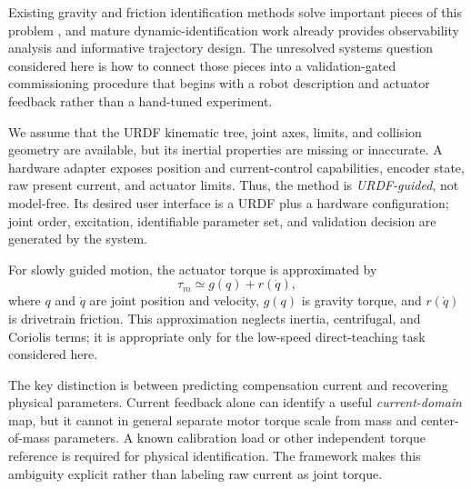 \documentclass[conference]{IEEEtran}
\begin{document}
Existing gravity and friction identification methods solve important pieces of
this problem \cite{Chen2018,Chen2023}, and mature dynamic-identification work
already provides observability analysis and informative trajectory design.
The unresolved systems question considered here is how to connect those pieces
into a validation-gated commissioning procedure that begins with a robot
description and actuator feedback rather than a hand-tuned experiment.

We assume that the URDF kinematic tree, joint axes, limits, and collision
geometry are available, but its inertial properties are missing or inaccurate.
A hardware adapter exposes position and current-control capabilities, encoder
state, raw present current, and actuator limits. Thus, the method is
\emph{URDF-guided}, not model-free. Its desired user interface is a URDF plus a
hardware configuration; joint order, excitation, identifiable parameter set,
and validation decision are generated by the system.

For slowly guided motion, the actuator torque is approximated by
\begin{equation}
 \tau_m \simeq g(q) + r(\dot{q}),
 \label{eq:quasistatic}
\end{equation}
where $q$ and $\dot{q}$ are joint position and velocity, $g(q)$ is gravity
torque, and $r(\dot{q})$ is drivetrain friction. This approximation neglects
inertia, centrifugal, and Coriolis terms; it is appropriate only for the
low-speed direct-teaching task considered here.

The key distinction is between predicting compensation current and recovering
physical parameters. Current feedback alone can identify a useful
\emph{current-domain} map, but it cannot in general separate motor torque scale
from mass and center-of-mass parameters. A known calibration load or other
independent torque reference is required for physical identification. The
framework makes this ambiguity explicit rather than labeling raw current as
joint torque.
\end{document}
